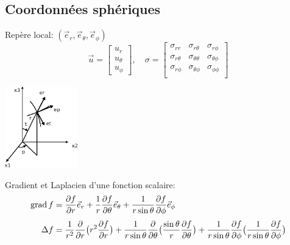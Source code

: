 \subsection{Coordonnées sphériques}
\begin{multicols}{2}
\noindent Repère local: $(\vec{e}_r,\vec{e}_{\theta},\vec{e}_{\phi})$
    \begin{displaymath}
        \vec{u} = 
        \begin{bmatrix}
            u_r \\
            u_{\theta} \\
            u_{\phi}
        \end{bmatrix}, \quad
        \mathbb{\sigma} = 
        \begin{bmatrix}
            \sigma_{rr} & \sigma_{r\theta} & \sigma_{r\phi} \\
            \sigma_{r\theta} & \sigma_{\theta\theta} & \sigma_{\theta\phi} \\
            \sigma_{r\phi} & \sigma_{\theta\phi} & \sigma_{\phi\phi} \\
        \end{bmatrix}
    \end{displaymath}

    \columnbreak

    \includegraphics[height=3.5cm]{../images/T1_AnnA-0003}

\end{multicols}
\noindent Gradient et Laplacien d'une fonction scalaire:
\begin{align*}
    \operatorname*{\mathrm{grad}} f &= \frac{\partial f}{\partial r} \vec{e}_r + \frac{1}{r} \frac{\partial f}{\partial \theta} \vec{e}_{\theta} + \frac{1}{r\sin \theta} \frac{\partial f}{\partial \phi} \vec{e}_{\phi} \\[3pt]
    \Delta f &= \frac{1}{r^2} \frac{\partial}{\partial r} \bigl( r^2 \frac{\partial f}{\partial r} \bigr) + \frac{1}{r\sin \theta} \frac{\partial}{\partial \theta}\bigl( \frac{\sin \theta}{r} \frac{\partial f}{\partial \theta} \bigr) + \frac{1}{r\sin \theta}\frac{\partial f}{\partial \phi} \bigl( \frac{1}{r\sin \theta} \frac{\partial f}{\partial \phi} \bigr)
\end{align*}
